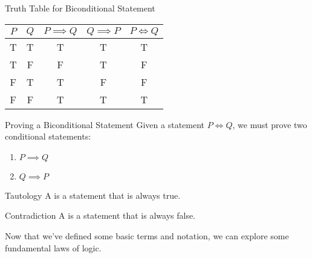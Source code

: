 \documentclass[letterpaper,12pt]{report}
\begin{document}
\begin{exbox}{Truth Table for Biconditional Statement}{}
	\begin{center}
		\begin{tabular}{ c | c || c | c | c }
			$P$ & $Q$ & $P\implies Q$ & $Q \implies P$ & $P \iff Q$ \\ \hline
			T & T & T & T & T\\ \hline
			T & F & F & T & F \\ \hline
			F & T & T & F & F \\ \hline
			F & F & T & T & T \\
		\end{tabular}
	\end{center}
\end{exbox}

\begin{tecbox}{Proving a Biconditional Statement}{}
	Given a statement $P \iff Q$, we must prove two conditional statements:
	\begin{enumerate}
		\item $P \implies Q$
		\item $Q \implies P$
	\end{enumerate}
\end{tecbox}

\begin{dfnbox}{Tautology}{}
	A  is a statement that is always true.
\end{dfnbox}

\begin{dfnbox}{Contradiction}{}
	A  is a statement that is always false.
\end{dfnbox}

Now that we've defined some basic terms and notation, we can explore some fundamental laws of logic.
\end{document}
